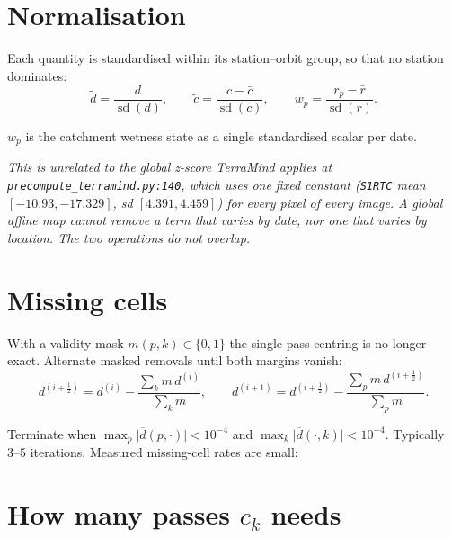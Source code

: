 \documentclass[10pt,a4paper]{article}
\newenvironment{quoting}%
  {\begin{list}{}{\setlength{\leftmargin}{1.4em}\setlength{\rightmargin}{1.4em}%
   \setlength{\topsep}{5pt}}\item[]\itshape}%
  {\end{list}}
\newcommand{\code}[1]{\texttt{\small #1}}
\begin{document}
\section{Normalisation}

Each quantity is standardised within its station--orbit group, so that no station dominates:
\[
\tilde d = \frac{d}{\operatorname{sd}(d)},
\qquad
\tilde c = \frac{c - \bar c}{\operatorname{sd}(c)},
\qquad
w_p = \frac{r_p - \bar r}{\operatorname{sd}(r)} .
\]

$w_p$ is the catchment wetness state as a single standardised scalar per date.

\begin{quoting}
This is unrelated to the global z-score TerraMind applies at \code{precompute\_terramind.py:140},
which uses one fixed constant (\code{S1RTC} mean $[-10.93, -17.329]$, sd $[4.391, 4.459]$)
for every pixel of every image. A global affine map cannot remove a term that varies by
date, nor one that varies by location. The two operations do not overlap.
\end{quoting}

\section{Missing cells}

With a validity mask $m(p,k) \in \{0,1\}$ the single-pass centring is no longer exact.
Alternate masked removals until both margins vanish:
\[
d^{(i+\frac12)} = d^{(i)} - \frac{\sum_k m\,d^{(i)}}{\sum_k m},
\qquad
d^{(i+1)} = d^{(i+\frac12)} - \frac{\sum_p m\,d^{(i+\frac12)}}{\sum_p m} .
\]

Terminate when $\max_p\big|\overline{d}(p,\cdot)\big| < 10^{-4}$ and
$\max_k\big|\overline{d}(\cdot,k)\big| < 10^{-4}$. Typically 3--5 iterations. Measured
missing-cell rates are small:


\section{How many passes $c_k$ needs}
\label{sec:npasses}
\end{document}
